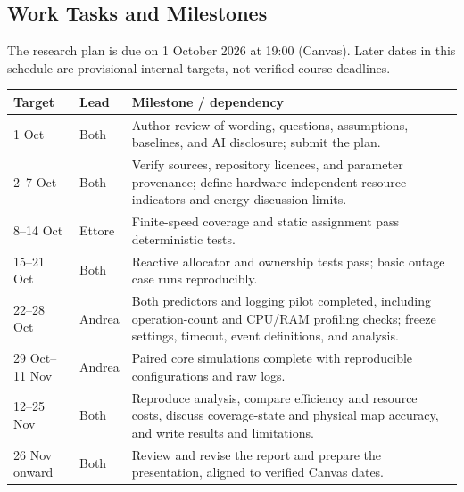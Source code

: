 \subsection{Work Tasks and Milestones}
The research plan is due on 1 October 2026 at 19:00 (Canvas). Later dates in this schedule are provisional internal targets, not verified course deadlines.

{\small{}
\begin{tabularx}{\linewidth}{@{}p{1.55cm}p{1.35cm}Y@{}}
\toprule
Target & Lead & Milestone / dependency\\
 Oct & Both & Author review of wording, questions, assumptions, baselines, and AI disclosure; submit the plan.\\
2--7 Oct & Both & Verify sources, repository licences, and parameter provenance; define hardware-independent resource indicators and energy-discussion limits.\\
8--14 Oct & Ettore & Finite-speed coverage and static assignment pass deterministic tests.\\
15--21 Oct & Both & Reactive allocator and ownership tests pass; basic outage case runs reproducibly.\\
22--28 Oct & Andrea & Both predictors and logging pilot completed, including operation-count and CPU/RAM profiling checks; freeze settings, timeout, event definitions, and analysis.\\
29 Oct--11 Nov & Andrea & Paired core simulations complete with reproducible configurations and raw logs.\\
12--25 Nov & Both & Reproduce analysis, compare efficiency and resource costs, discuss coverage-state and physical map accuracy, and write results and limitations.\\
26 Nov onward & Both & Review and revise the report and prepare the presentation, aligned to verified Canvas dates.\\
\bottomrule
\end{tabularx}\par}

